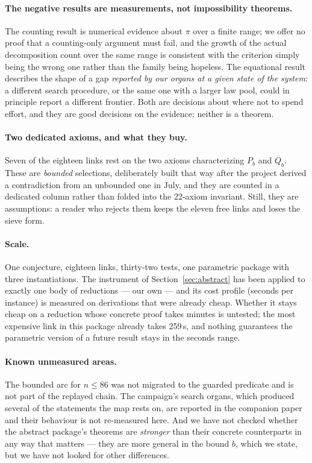 \documentclass[11pt]{article}
\theoremstyle{remark}\newtheorem{remark}{Remark}
\begin{document}
\paragraph{The negative results are measurements, not impossibility theorems.} The
counting result is numerical evidence about $\pi$ over a finite range; we offer no proof
that a counting-only argument must fail, and the growth of the actual decomposition
count over the same range is consistent with the criterion simply being the wrong one
rather than the family being hopeless. The equational result describes the shape of a
gap \emph{reported by our organs at a given state of the system}: a different search
procedure, or the same one with a larger law pool, could in principle report a different
frontier. Both are decisions about where not to spend effort, and they are good
decisions on the evidence; neither is a theorem.

\paragraph{Two dedicated axioms, and what they buy.} Seven of the eighteen links rest on
the two axioms characterizing $P_b$ and $Q_b$. These are \emph{bounded} selections,
deliberately built that way after the project derived a contradiction from an unbounded
one in July, and they are counted in a dedicated column rather than folded into the
22-axiom invariant. Still, they are assumptions: a reader who rejects them keeps the
eleven free links and loses the sieve form.

\paragraph{Scale.} One conjecture, eighteen links, thirty-two tests, one parametric
package with three instantiations. The instrument of Section~\ref{sec:abstract} has been
applied to exactly one body of reductions --- our own --- and its cost profile (seconds
per instance) is measured on derivations that were already cheap. Whether it stays cheap
on a reduction whose concrete proof takes minutes is untested; the most expensive link
in this package already takes 259\,s, and nothing guarantees the parametric version of a
future result stays in the seconds range.

\paragraph{Known unmeasured areas.} The bounded arc for $n \le 86$ was not migrated to
the guarded predicate and is not part of the replayed chain. The campaign's search
organs, which produced several of the statements the map rests on, are reported in the
companion paper and their behaviour is not re-measured here. And we have not checked
whether the abstract package's theorems are \emph{stronger} than their concrete
counterparts in any way that matters --- they are more general in the bound $b$, which we
state, but we have not looked for other differences.
\end{document}
